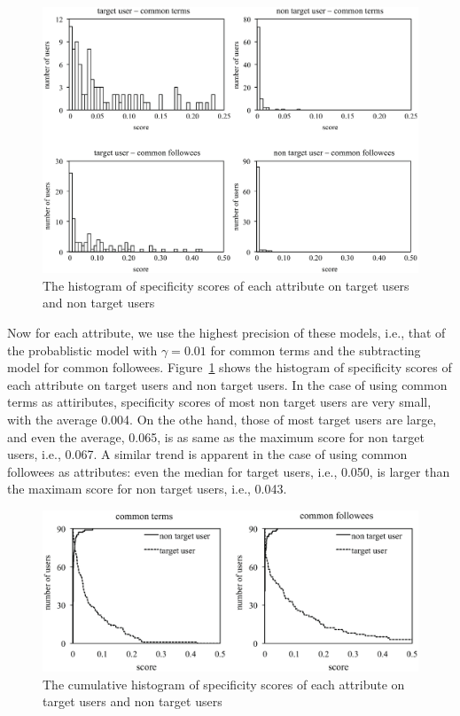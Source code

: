 {\footnotesize
\begin{figure}[t]
\begin{center}
\includegraphics[width=14cm]{images/histogram.eps}
 \caption{The histogram of specificity scores of each attribute on
 target users and non target users}
\label{fig:histogram}
\end{center}
\end{figure}
}

Now for each attribute, we use the highest precision of these models,
i.e., that of the probablistic model with $\gamma=0.01$ for common terms
and the subtracting model for common
followees. Figure~\ref{fig:histogram} shows the histogram of specificity
scores of each attribute on target users and non target users.  In the
case of using common terms as attiributes, specificity scores of most
non target users are very small, with the average 0.004.  On the othe
hand, those of most target users are large, and even the average, 0.065,
is as same as the maximum score for non target users, i.e., 0.067.  A
similar trend is apparent in the case of using common followees as
attributes: even the median for target users, i.e., 0.050, is larger
than the maximam score for non target users, i.e., 0.043.

{\footnotesize
\begin{figure}[t]
\begin{center}
\includegraphics[width=14cm]{images/cumulativehistogram.eps}
 \caption{The cumulative histogram of specificity scores of each
 attribute on target users and non target users}
\label{fig:cumulativehistogram}
\end{center}
\end{figure}
}

